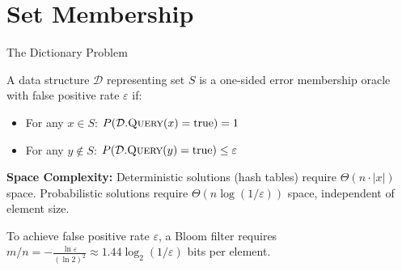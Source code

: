 \documentclass{beamer}
\begin{document}
\section{Set Membership}

\begin{frame}{The Dictionary Problem}

    \begin{definition}
        A data structure $\mathcal{D}$ representing set $S$ is a one-sided error membership oracle with false positive rate $\varepsilon$ if:
        \begin{itemize}
            \item For any $x \in S$: $P(\mathcal{D}.\textsc{Query}(x) = \text{true}) = 1$
            \item For any $y \notin S$: $P(\mathcal{D}.\textsc{Query}(y) = \text{true}) \leq \varepsilon$
        \end{itemize}
    \end{definition}

    \vspace{0.5em}

    \textbf{Space Complexity:}
    Deterministic solutions (hash tables) require $\Theta(n \cdot |x|)$ space.
    Probabilistic solutions require $\Theta(n \log(1/\varepsilon))$ space, independent of element size.

    \vspace{0.5em}

    \begin{theorem}
        To achieve false positive rate $\varepsilon$, a Bloom filter requires $m/n = -\frac{\ln \varepsilon}{(\ln 2)^2} \approx 1.44 \log_2(1/\varepsilon)$ bits per element.
    \end{theorem}

\end{frame}
\end{document}
